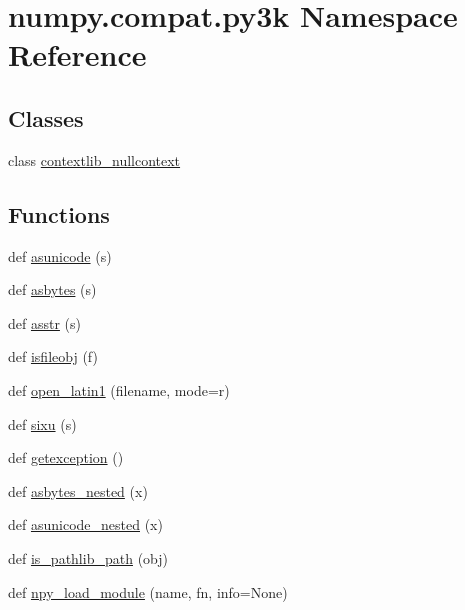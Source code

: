 \hypertarget{namespacenumpy_1_1compat_1_1py3k}{}\section{numpy.\+compat.\+py3k Namespace Reference}
\label{namespacenumpy_1_1compat_1_1py3k}
\subsection*{Classes}
\begin{DoxyCompactItemize}
\item 
class \hyperlink{classnumpy_1_1compat_1_1py3k_1_1contextlib__nullcontext}{contextlib\+\_\+nullcontext}
\end{DoxyCompactItemize}
\subsection*{Functions}
\begin{DoxyCompactItemize}
\item 
def \hyperlink{namespacenumpy_1_1compat_1_1py3k_a5625596f67f971d8eeffaa3b7a78e127}{asunicode} (s)
\item 
def \hyperlink{namespacenumpy_1_1compat_1_1py3k_a0e4c1877cc0703fd83532b9457b70675}{asbytes} (s)
\item 
def \hyperlink{namespacenumpy_1_1compat_1_1py3k_a561643db7f7ad466568364f1f12cbb10}{asstr} (s)
\item 
def \hyperlink{namespacenumpy_1_1compat_1_1py3k_acb943fb634b941f7d79ac395862c3f1b}{isfileobj} (f)
\item 
def \hyperlink{namespacenumpy_1_1compat_1_1py3k_ad16580ea722ec9e6647dbedab2d1ad8c}{open\+\_\+latin1} (filename, mode=\textquotesingle{}r\textquotesingle{})
\item 
def \hyperlink{namespacenumpy_1_1compat_1_1py3k_a82e8badcc0f42cede53768dc90574134}{sixu} (s)
\item 
def \hyperlink{namespacenumpy_1_1compat_1_1py3k_a76ba253c6c22eb7023fa8ee0d0b052ad}{getexception} ()
\item 
def \hyperlink{namespacenumpy_1_1compat_1_1py3k_ab8f60d728b33db279ba3f1f44c16106e}{asbytes\+\_\+nested} (x)
\item 
def \hyperlink{namespacenumpy_1_1compat_1_1py3k_a9434da169eea2e18089d38e421ef182f}{asunicode\+\_\+nested} (x)
\item 
def \hyperlink{namespacenumpy_1_1compat_1_1py3k_a9a230220ac3959f280b621c7a2f5cd47}{is\+\_\+pathlib\+\_\+path} (obj)
\item 
def \hyperlink{namespacenumpy_1_1compat_1_1py3k_aa63d14ca8aedf8164ece7cc7c5483f6b}{npy\+\_\+load\+\_\+module} (name, fn, info=None)
\end{DoxyCompactItemize}
